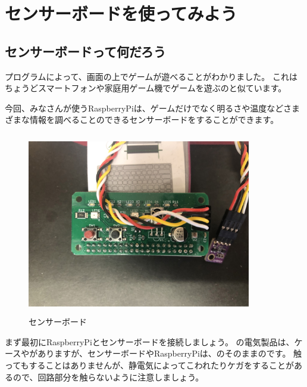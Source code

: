 
\clearpage
\section{センサーボードを使ってみよう}
\subsection{センサーボードって何だろう}

プログラムによって、画面の上でゲームが遊べることがわかりました。
これはちょうどスマートフォンや家庭用ゲーム機でゲームを遊ぶのと似ています。

今回、みなさんが使うRaspberryPiは、ゲームだけでなく明るさや温度などさまざまな情報を調べることのできるセンサーボードをすることができます。

\begin{figure}[H]
    \begin{center}
        \includegraphics[keepaspectratio,width=9.79cm,height=7.955cm]{text02-img/sensor1.jpg}
        \caption{センサーボード}
    \end{center}
    \label{fig:folder_icon}
\end{figure}

まず最初にRaspberryPiとセンサーボードを接続しましょう。
の電気製品は、ケースやがありますが、センサーボードやRaspberryPiは、のそのままのです。
触ってもすることはありませんが、静電気によってこわれたりケガをすることがあるので、回路部分を触らないように注意しましょう。

